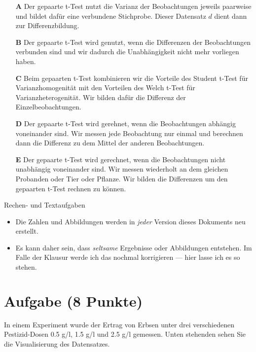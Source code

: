 \documentclass[a4paper, 10pt]{scrartcl}\usepackage[]{graphicx}\usepackage[]{color}
\begin{document}
\begin{enumerate}
\item [\textbf{A} \msquare] Der gepaarte t-Test nutzt die Varianz der Beobachtungen jeweils paarweise und bildet dafür eine verbundene Stichprobe. Dieser Datensatz $d$ dient dann zur Differenzbildung.
\item [\textbf{B} \msquare] Der gepaarte t-Test wird genutzt, wenn die Differenzen der Beobachtungen verbunden sind und wir dadurch die Unabhängigkeit nicht mehr vorliegen haben.
\item [\textbf{C} \msquare] Beim gepaarten t-Test kombinieren wir die Vorteile des Student t-Test für Varianzhomogenität mit den Vorteilen des Welch t-Test für Varianzheterogenität. Wir bilden dafür die Differenz der Einzelbeobachtungen.
\item [\textbf{D} \msquare] Der gepaarte t-Test wird gerehnet, wenn die Beobachtungen abhängig voneinander sind. Wir messen jede Beobachtung nur einmal und berechnen dann die Differenz zu dem Mittel der anderen Beobachtungen.
\item [\textbf{E} \msquare] Der gepaarte t-Test wird gerechnet, wenn die Beobachtungen nicht unabhängig voneinander sind. Wir messen wiederholt an dem gleichen Probanden oder Tier oder Pflanze. Wir bilden die Differenzen um den gepaarten t-Test rechnen zu können.
\end{enumerate}   
\clearpage
\begin{graybox}{Rechen- und Textaufgaben}
  \begin{itemize}
  \item Die Zahlen und Abbildungen werden in \textit{jeder} Version dieses
    Dokuments neu erstellt.
  \item Es kann daher sein, dass \textit{seltsame} Ergebnisse oder
    Abbildungen entstehen. Im Falle der Klausur werde ich das nochmal
    korrigieren --- hier lasse ich es so stehen.  
  \end{itemize}
\end{graybox}
\clearpage

\section{Aufgabe \hfill (8 Punkte)}

In einem Experiment wurde der Ertrag von Erbsen unter drei verschiedenen
Pestizid-Dosen 0.5 g/l, 1.5 g/l und 2.5 g/l gemessen. Unten stehenden sehen
Sie die Visualisierung des Datensatzes.
\end{document}
